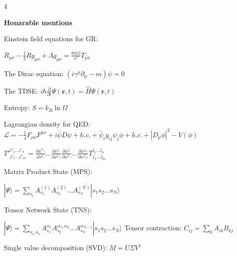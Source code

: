 \documentclass[a4paper,twoside]{article}
\newcommand{\secblock}[1]{%
\par\vspace{1.8pt}%
\noindent\colorbox{hdrcol}{\parbox[c][1.0em][c]{0.98\linewidth}{\color{white}\bfseries\small #1}}\par
\vspace{1pt}%
}
\begin{document}
\begin{multicols*}{4}
\secblock{Honarable mentions}

Einstein field equations for GR:

\(R_{\mu\nu} - \frac{1}{2}R g_{\mu\nu} + \Lambda g_{\mu\nu} = \frac{8\pi G}{c^4} T_{\mu\nu}\)

The Dirac equation:
\((i\gamma^\mu \partial_\mu - m)\psi = 0\)

The TDSE:
\(i\hbar \frac{\partial}{\partial t} \Psi(\mathbf{r}, t) = \hat{H} \Psi(\mathbf{r}, t)\)

Entropy:
\(S = k_B \ln \Omega\)

Lagrangian density for QED:
\(\mathcal{L} = -\frac{1}{4}F_{\mu\nu}F^{\mu\nu} + i\bar{\psi}D\psi + h.c. + \bar{\psi}_i y_{ij} \psi_j \phi + h.c. + |D_\mu \phi|^2 - V(\phi)\)


\(T'^{i'_1 \dots i'_n}_{j'_1 \dots j'_m} = \frac{\partial x^{i'_1}}{\partial x^{i_1}} \dots \frac{\partial x^{i_n}}{\partial x^{i'_n}} \frac{\partial x^{j_1}}{\partial x^{j'_1}} \dots \frac{\partial x^{j_m}}{\partial x^{j'_m}} T^{i_1 \dots i_n}_{j_1 \dots j_m}\)

Matrix Product State (MPS):

\(|\Psi\rangle = \sum_{s_i} A^{(1)}_{s_1} A^{(2)}_{s_2} \dots A^{(N)}_{s_N} |s_1 s_2 \dots s_N\rangle\)

Tensor Network State (TNS):

\(|\Psi\rangle = \sum_{s_i,\alpha_i} A_{s_1}^{\alpha_1} A^{ \alpha_1, \alpha_2}_{s_2} \dots A^{\alpha_{N-1}}_{s_N} |s_1 s_2 \dots s_N\rangle\) 
Tensor contraction:
\(C_{ij} = \sum_{k} A_{ik} B_{kj}\)

Single value decomposition (SVD): \(M = U \Sigma V^\dagger\)

\end{multicols*}
\end{document}
